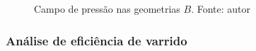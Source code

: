 \begin{figure}[H]
\begin{subfigure}[b]{0.42\linewidth}
    	\end{subfigure}
    	\caption{Campo de pressão nas geometrias $B$. Fonte: autor}
    	\label{fig:cpressaoB1B2}
\end{figure}

\subsubsection{Análise de eficiência de varrido}

